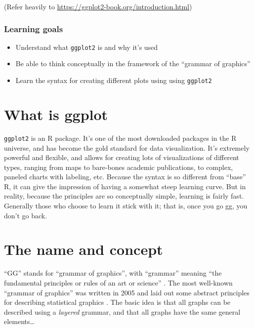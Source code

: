 \documentclass[
]{book}
\providecommand{\tightlist}{%
  \setlength{\itemsep}{0pt}\setlength{\parskip}{0pt}}
\begin{document}
(Refer heavily to \url{https://ggplot2-book.org/introduction.html})

\hypertarget{learning-goals-7}{%
\subsubsection*{Learning goals}\label{learning-goals-7}}

\begin{itemize}
\tightlist
\item
  Understand what \texttt{ggplot2} is and why it's used
\item
  Be able to think conceptually in the framework of the ``grammar of graphics''
\item
  Learn the syntax for creating different plots using using \texttt{ggplot2}
\end{itemize}

\hypertarget{what-is-ggplot}{%
\section{What is ggplot}\label{what-is-ggplot}}

\texttt{ggplot2} is an R package. It's one of the most downloaded packages in the R universe, and has become the gold standard for data visualization. It's extremely powerful and flexible, and allows for creating lots of visualizations of different types, ranging from maps to bare-bones academic publications, to complex, paneled charts with labeling, etc. Because the syntax is so different from ``base'' R, it can give the impression of having a somewhat steep learning curve. But in reality, because the principles are so conceptually simple, learning is fairly fast. Generally those who choose to learn it stick with it; that is, once you go gg, you don't go back.

\hypertarget{the-name-and-concept}{%
\section{The name and concept}\label{the-name-and-concept}}

``GG'' stands for ``grammar of graphics'', with ``grammar'' meaning ``the fundamental principles or rules of an art or science'' \citep{layered-grammar}. The most well-known ``grammar of graphics'' was written in 2005 and laid out some abstract principles for describing statistical graphics \citep{10.5555/1088896}. The basic idea is that all graphs can be described using a \emph{layered} grammar, and that all graphs have the same general elements\ldots{}
\end{document}
